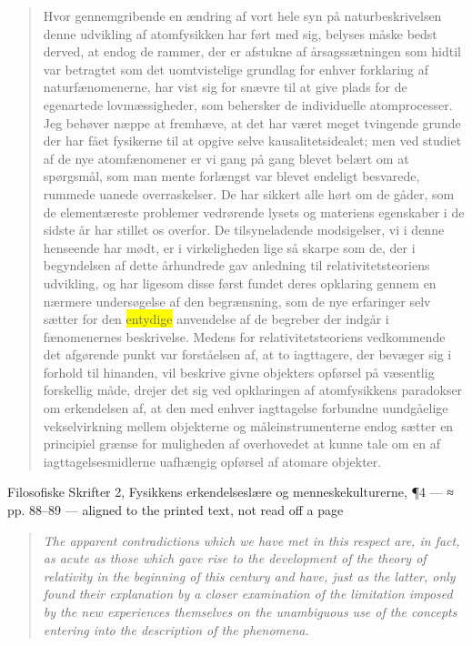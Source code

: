\documentclass[11pt]{article}
\newcommand{\dcite}[1]{{\nopagebreak\raggedleft\small #1\par}\medskip}
\newcommand{\tlg}[1]{{\setlength{\fboxsep}{0.8pt}\colorbox{yellow}{#1}}}
\newcommand{\olg}[1]{{\setlength{\fboxsep}{0.8pt}\colorbox{cyan!25}{#1}}}
\begin{document}
\begin{quote}
Hvor gennemgribende en ændring af vort hele syn på naturbeskrivelsen denne udvikling af atomfysikken har ført med sig, belyses måske bedst derved, at endog de rammer, der er afstukne af årsagssætningen som hidtil var betragtet som det uomtvistelige grundlag for enhver forklaring af naturfænomenerne, har vist sig for snævre til at give plads for de egenartede lovmæssigheder, som behersker de individuelle atomprocesser. Jeg behøver næppe at fremhæve, at det har været meget tvingende grunde der har fået fysikerne til at opgive selve kausalitetsidealet; men ved studiet af de nye atomfænomener er vi gang på gang blevet belært om at spørgsmål, som man mente forlængst var blevet endeligt besvarede, rummede uanede overraskelser. De har sikkert alle hørt om de gåder, som de elementæreste problemer vedrørende lysets og materiens egenskaber i de sidste år har stillet os overfor. De tilsyneladende modsigelser, vi i denne henseende har mødt, er i virkeligheden lige så skarpe som de, der i begyndelsen af dette århundrede gav anledning til relativitetsteoriens udvikling, og har ligesom disse først fundet deres opklaring gennem en nærmere undersøgelse af den begrænsning, som de nye erfaringer selv sætter for den \tlg{entydige} anvendelse af de begreber der indgår i fænomenernes beskrivelse. Medens for relativitetsteoriens vedkommende det afgørende punkt var forståelsen af, at to iagttagere, der bevæger sig i forhold til hinanden, vil beskrive givne objekters opførsel på væsentlig forskellig måde, drejer det sig ved opklaringen af atomfysikkens paradokser om erkendelsen af, at den med enhver iagttagelse forbundne uundgåelige vekselvirkning mellem objekterne og måleinstrumenterne endog sætter en principiel grænse for muligheden af overhovedet at kunne tale om en af iagttagelsesmidlerne uafhængig opførsel af atomare objekter.
\end{quote}
\dcite{Filosofiske Skrifter 2, Fysikkens erkendelseslære og menneskekulturerne, ¶4 — ≈ pp. 88–89 — aligned to the printed text, not read off a page}
{\footnotesize\begin{quote}\itshape
The apparent contradictions which we have met in this respect are, in fact, as acute as those which gave rise to the development of the theory of relativity in the beginning of this century and have, just as the latter, only found their explanation by a closer examination of the limitation imposed by the new experiences themselves on the \olg{unambiguous} use of the concepts entering into the description of the phenomena.
\end{quote}}
\end{document}
